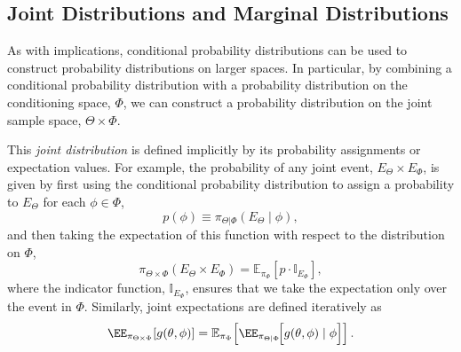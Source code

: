 \subsection{Joint Distributions and Marginal Distributions}

As with implications, conditional probability distributions can be used
to construct probability distributions on larger spaces.  In particular,
by combining a conditional probability distribution with a probability 
distribution on the conditioning space, $\Phi$, we can construct a 
probability distribution on the joint sample space, $\Theta \times \Phi$.  

This \emph{joint distribution} is defined implicitly by its probability 
assignments or expectation values.  For example, the probability of 
any joint event, $E_{\Theta} \times E_{\Phi}$, is given by first using 
the conditional probability distribution to assign a probability to 
$E_{\Theta}$ for each $\phi \in \Phi$,
%
\begin{equation*}
p \! \left( \phi \right) \equiv 
\pi_{\Theta | \Phi} \! \left( E_{\Theta} \mid \phi \right),
\end{equation*}
%
and then taking the expectation of this function with respect to the 
distribution on $\Phi$,
%
\begin{equation*}
\pi_{\Theta \times \Phi} \! \left( E_{\Theta} \times E_{\Phi} \right)
=
\mathbb{E}_{\pi_{\Phi}} \! \left[  p \cdot \mathbb{I}_{E_{\Phi}} \right],
\end{equation*}
%
where the indicator function, $\mathbb{I}_{E_{\Phi}}$, ensures that 
we take the expectation only over the event in $\Phi$.  Similarly, joint 
expectations are defined iteratively as
%
\begin{equation*}
\EE_{\pi_{\Theta \times \Phi}} \! \left[ g \! \left( \theta, \phi \right) \right]
=
\mathbb{E}_{\pi_{\Phi}} \! \left[  
\EE_{\pi_{\Theta|\Phi}} \! \Big[ 
g \! \left( \theta, \phi \right) \mid \phi 
\Big]
\right].
\end{equation*}


